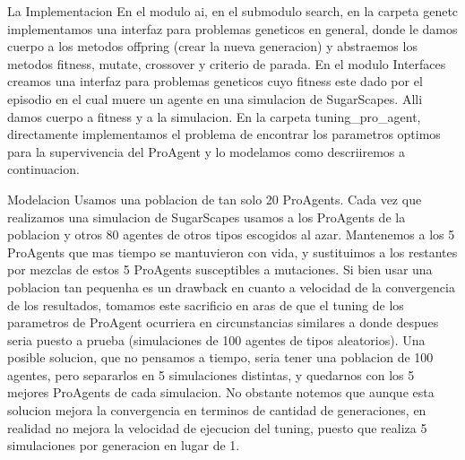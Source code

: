 \documentclass{beamer}
\begin{document}
\begin{frame}{La Implementacion}
En el modulo ai, en el submodulo search, en la carpeta genetc implementamos una interfaz para problemas geneticos en general, donde le damos cuerpo a los metodos offpring (crear la nueva generacion) y abstraemos los metodos fitness, mutate, crossover y criterio de parada.
En el modulo Interfaces creamos una interfaz para problemas geneticos cuyo fitness este dado por el episodio en el cual muere un agente en una simulacion de SugarScapes. Alli damos cuerpo a fitness y a la simulacion.
En la carpeta tuning_pro_agent, directamente implementamos el problema de encontrar los parametros optimos para la supervivencia del ProAgent y lo modelamos como descriiremos a continuacion.
\end{frame}

\begin{frame}{Modelacion}
    Usamos una poblacion de tan solo 20 ProAgents. Cada vez que realizamos una simulacion de SugarScapes usamos a los ProAgents de la poblacion y otros 80 agentes de otros tipos escogidos al azar. Mantenemos a los 5 ProAgents que mas tiempo se mantuvieron con vida, y sustituimos a los restantes por mezclas de estos 5 ProAgents susceptibles a mutaciones.
    Si bien usar una poblacion tan pequenha es un drawback en cuanto a velocidad de la convergencia de los resultados, tomamos este sacrificio en aras de que el tuning de los parametros de ProAgent ocurriera en circunstancias similares a donde despues seria puesto a prueba (simulaciones de 100 agentes de tipos aleatorios). Una posible solucion, que no pensamos a tiempo, seria tener una poblacion de 100 agentes, pero separarlos en 5 simulaciones distintas, y quedarnos con los 5 mejores ProAgents de cada simulacion. No obstante notemos que aunque esta solucion mejora la convergencia en terminos de cantidad de generaciones, en realidad no mejora la velocidad de ejecucion del tuning, puesto que realiza 5 simulaciones por generacion en lugar de 1.
\end{frame}
\end{document}

